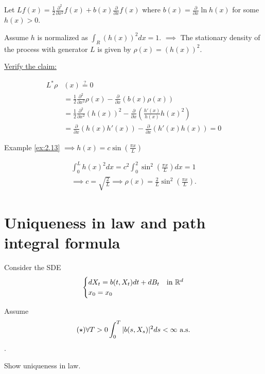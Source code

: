 \begin{example}\label{ex:2.19}
    Let $Lf(x)=\frac{1}{2}\frac{\partial^2}{\partial x^2} f(x)+b(x)\frac{\partial }{\partial x}f(x)$
    where $b(x)=\frac{\partial}{\partial x}\ln h(x)$ for some $h(x)>0$.


    Assume $h$ is normalized as $\int_R (h(x))^2 dx=1$. 
    $\implies$  The stationary density of the process with generator $L$ is given by 
    $\rho(x)=(h(x))^2$.

    \underline{Verify the claim:}

    \begin{align*}
        L^*\rho&(x)\stackrel{?}{=}0\\
        &=\frac{1}{2}\frac{\partial^2}{\partial x^2} \rho(x)-\frac{\partial}{\partial x}(b(x)\rho(x))\\
        &=\frac{1}{2}\frac{\partial^2}{\partial x^2} (h(x))^2-\frac{\partial}{\partial x}(\frac{h'(x)}{h(x)}h(x)^2)\\
        &=\frac{\partial}{\partial x} (h(x)h'(x))-\frac{\partial}{\partial x}(h'(x)h(x))=0
    \end{align*}

    Example \ref{ex:2.13} $\implies h(x)=c\sin(\frac{\pi x}{L})$

    \begin{align*}
        \int_0^L h(x)^2dx=c^2\int_0^2\sin^2(\frac{\pi x}{L})dx=1\\
        \implies c=\sqrt{\frac{2}{L}}\implies \rho(x)=\frac{2}{L}\sin^2(\frac{\pi x}{L}).
    \end{align*}
\end{example}


\section{Uniqueness in law and path integral formula}

Consider the SDE \[\begin{cases}
    dX_t=b(t,X_t)dt+dB_t & \text{in }\mathbb{R}^d\\
    x_0=x_0
\end{cases}\]

Assume \begin{equation*}\
   (\star) \forall T>0 \int_0^T|b(s,X_s)|^2ds < \infty\text{ a.s. }
\end{equation*}.

 Show uniqueness in law.

